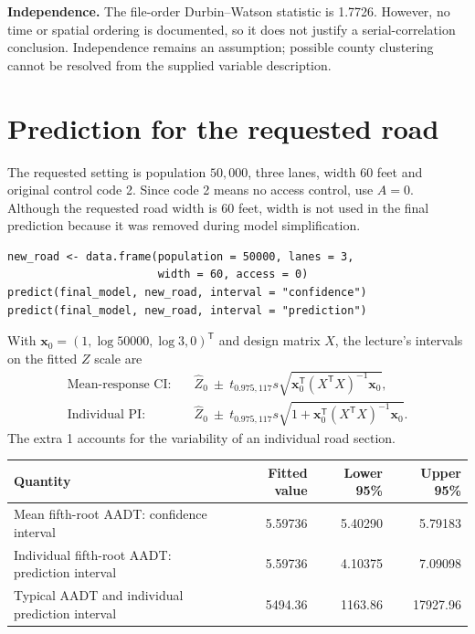 \documentclass[11pt,a4paper]{article}
\begin{document}
\textbf{Independence.} The file-order Durbin--Watson statistic is 1.7726.
However, no time or spatial ordering is documented, so it does not justify a
serial-correlation conclusion. Independence remains an assumption; possible
county clustering cannot be resolved from the supplied variable description.

\section{Prediction for the requested road}
The requested setting is population $50{,}000$, three lanes, width 60 feet and
original control code 2. Since code 2 means no access control, use $A=0$.
Although the requested road width is 60 feet, width is not used in the final
prediction because it was removed during model simplification.

\begin{lstlisting}[style=rcode,numbers=none]
new_road <- data.frame(population = 50000, lanes = 3,
                       width = 60, access = 0)
predict(final_model, new_road, interval = "confidence")
predict(final_model, new_road, interval = "prediction")
\end{lstlisting}

With $\mathbf{x}_0=(1,\log 50000,\log 3,0)^\mathsf{T}$ and design matrix $X$,
the lecture's intervals on the fitted $Z$ scale are
\begin{align*}
\text{Mean-response CI:}\quad&
\widehat Z_0\ \pm\ t_{0.975,117}s
 \sqrt{\mathbf{x}_0^\mathsf{T}(X^\mathsf{T}X)^{-1}\mathbf{x}_0},\\
\text{Individual PI:}\quad&
\widehat Z_0\ \pm\ t_{0.975,117}s
 \sqrt{1+\mathbf{x}_0^\mathsf{T}(X^\mathsf{T}X)^{-1}\mathbf{x}_0}.
\end{align*}
The extra 1 accounts for the variability of an individual road section.

\begin{center}
\begin{tabularx}{\linewidth}{@{}Yrrr@{}}
\toprule Quantity & Fitted value & Lower 95\% & Upper 95\%\\ \midrule
Mean fifth-root AADT: confidence interval & 5.59736 & 5.40290 & 5.79183\\
Individual fifth-root AADT: prediction interval & 5.59736 & 4.10375 & 7.09098\\
Typical AADT and individual prediction interval & 5494.36 & 1163.86 & 17927.96\\
\bottomrule
\end{tabularx}
\end{center}
\end{document}
